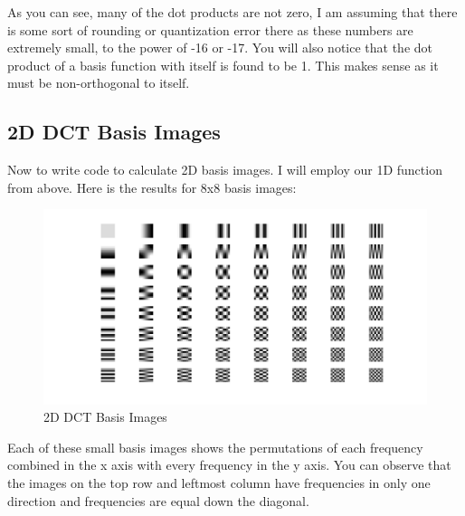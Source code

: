 As you can see, many of the dot products are not zero, I am assuming that there
is some sort of rounding or quantization error there as these numbers are
extremely small, to the power of -16 or -17. You will also notice that the dot
product of a basis function with itself is found to be 1. This makes sense as it
must be non-orthogonal to itself.

\subsection{2D DCT Basis Images}

Now to write code to calculate 2D basis images. I will employ our 1D function
from above. Here is the results for 8x8 basis images:

\begin{figure}[H]
    \centering
    \includegraphics[scale=0.3]{dct2.png}
    \caption{2D DCT Basis Images}
\end{figure}

Each of these small basis images shows the permutations of each frequency
combined in the x axis with every frequency in the y axis. You can observe that
the images on the top row and leftmost column have frequencies in only one
direction and frequencies are equal down the diagonal.
